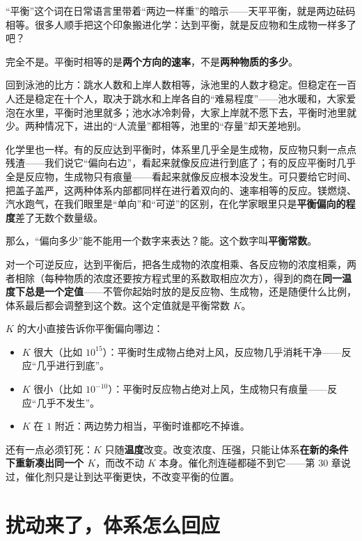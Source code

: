 “平衡”这个词在日常语言里带着“两边一样重”的暗示——天平平衡，就是两边砝码相等。很多人顺手把这个印象搬进化学：达到平衡，就是反应物和生成物一样多了吧？

完全不是。平衡时相等的是\textbf{两个方向的速率}，不是\textbf{两种物质的多少}。

回到泳池的比方：跳水人数和上岸人数相等，泳池里的人数才稳定。但稳定在一百人还是稳定在十个人，取决于跳水和上岸各自的“难易程度”——池水暖和，大家爱泡在水里，平衡时池里就多；池水冰冷刺骨，大家上岸就不愿下去，平衡时池里就少。两种情况下，进出的“人流量”都相等，池里的“存量”却天差地别。

化学里也一样。有的反应达到平衡时，体系里几乎全是生成物，反应物只剩一点点残渣——我们说它“偏向右边”，看起来就像反应进行到底了；有的反应平衡时几乎全是反应物，生成物只有痕量——看起来就像反应根本没发生。可只要给它时间、把盖子盖严，这两种体系内部都同样在进行着双向的、速率相等的反应。镁燃烧、汽水跑气，在我们眼里是“单向”和“可逆”的区别，在化学家眼里只是\textbf{平衡偏向的程度}差了无数个数量级。

那么，“偏向多少”能不能用一个数字来表达？能。这个数字叫\textbf{平衡常数}。

\begin{qiaoliang}
对一个可逆反应，达到平衡后，把各生成物的浓度相乘、各反应物的浓度相乘，两者相除（每种物质的浓度还要按方程式里的系数取相应次方），得到的商在\textbf{同一温度下总是一个定值}——不管你起始时放的是反应物、生成物，还是随便什么比例，体系最后都会调整到这个数。这个定值就是平衡常数 $K$。

$K$ 的大小直接告诉你平衡偏向哪边：
\begin{itemize}[itemsep=2pt]
\item $K$ 很大（比如 $10^{15}$）：平衡时生成物占绝对上风，反应物几乎消耗干净——反应“几乎进行到底”。
\item $K$ 很小（比如 $10^{-10}$）：平衡时反应物占绝对上风，生成物只有痕量——反应“几乎不发生”。
\item $K$ 在 $1$ 附近：两边势力相当，平衡时谁都吃不掉谁。
\end{itemize}
还有一点必须钉死：$K$ 只随\textbf{温度}改变。改变浓度、压强，只能让体系\textbf{在新的条件下重新凑出同一个 $K$}，而改不动 $K$ 本身。催化剂连碰都碰不到它——第 30 章说过，催化剂只是让到达平衡更快，不改变平衡的位置。
\end{qiaoliang}

\section{扰动来了，体系怎么回应}

